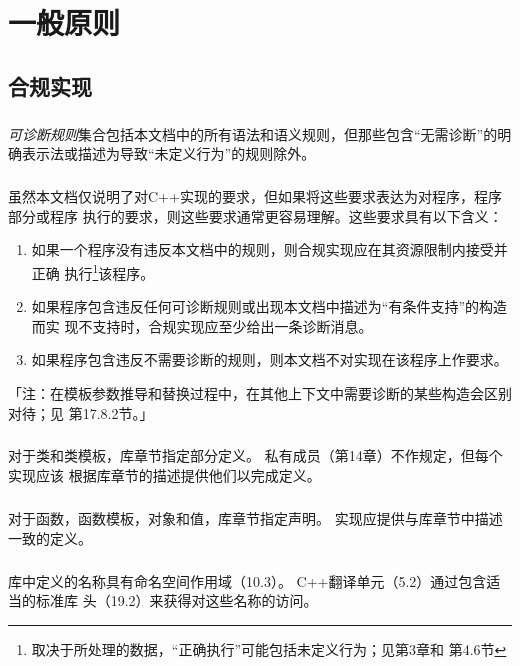 \chapter{一般原则}

\section{合规实现}

\paragraph{}
\textit{可诊断规则}集合包括本文档中的所有语法和语义规则，但那些包含“无需诊断”的明
确表示法或描述为导致“未定义行为”的规则除外。

\paragraph{}
虽然本文档仅说明了对C++实现的要求，但如果将这些要求表达为对程序，程序部分或程序
执行的要求，则这些要求通常更容易理解。这些要求具有以下含义：
\begin{enumerate}
  \item 如果一个程序没有违反本文档中的规则，则合规实现应在其资源限制内接受并正确
    执行\footnote{取决于所处理的数据，“正确执行”可能包括未定义行为；见第3章和
    第4.6节}该程序。
  \item 如果程序包含违反任何可诊断规则或出现本文档中描述为“有条件支持”的构造而实
    现不支持时，合规实现应至少给出一条诊断消息。
  \item 如果程序包含违反不需要诊断的规则，则本文档不对实现在该程序上作要求。
\end{enumerate}
「注：在模板参数推导和替换过程中，在其他上下文中需要诊断的某些构造会区别对待；见
第17.8.2节。」

\paragraph{}
对于类和类模板，库章节指定部分定义。 私有成员（第14章）不作规定，但每个实现应该
根据库章节的描述提供他们以完成定义。

\paragraph{}
对于函数，函数模板，对象和值，库章节指定声明。 实现应提供与库章节中描述一致的定义。

\paragraph{}
库中定义的名称具有命名空间作用域（10.3）。 C++翻译单元（5.2）通过包含适当的标准库
头（19.2）来获得对这些名称的访问。

